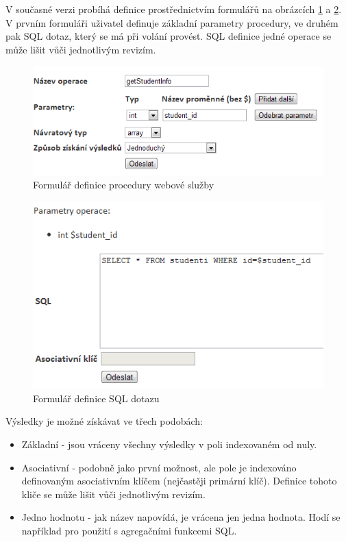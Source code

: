 \documentclass[11pt,twoside,a4paper]{book}
\begin{document}
V současné verzi probíhá definice prostřednictvím formulářů na obrázcích \ref{fig:defOperace} a \ref{fig:defSQL}. V prvním formuláři uživatel definuje základní parametry procedury, ve druhém pak SQL dotaz, který se má při volání provést. SQL definice jedné operace se může lišit vůči jednotlivým revizím. 

\begin{figure}[h]
\begin{center}
\includegraphics[scale=0.5]{figures/operace.png}
\caption{Formulář definice procedury webové služby}
\label{fig:defOperace}
\end{center}
\end{figure}

\begin{figure}[h]
\begin{center}
\includegraphics[scale=0.5]{figures/sql.png}
\caption{Formulář definice SQL dotazu}
\label{fig:defSQL}
\end{center}
\end{figure}

Výsledky je možné získávat ve třech podobách:
\begin{itemize}
\item Základní - jsou vráceny všechny výsledky v poli indexovaném od nuly.
\item Asociativní - podobně jako první možnost, ale pole je indexováno definovaným asociativním klíčem (nejčastěji primární klíč). Definice tohoto kliče se může lišit vůči jednotlivým revizím.
\item Jedno hodnotu - jak název napovídá, je vrácena jen jedna hodnota. Hodí se například pro použití s agregačními funkcemi SQL.
\end{itemize}
\end{document}
